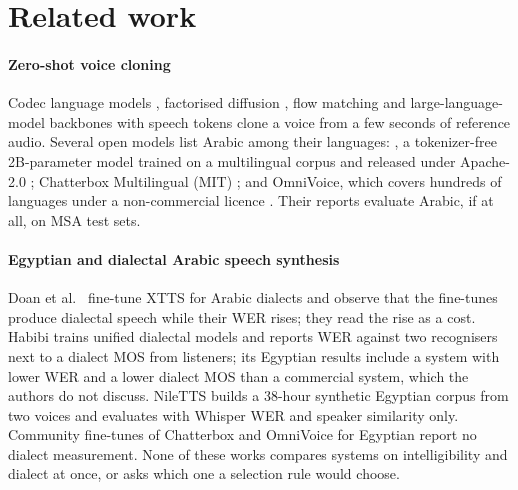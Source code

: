 \section{Related work}\label{sec:related}

\paragraph{Zero-shot voice cloning}
Codec language models \citep{chen2025valle}, factorised diffusion \citep{ju2024naturalspeech3}, flow matching
\citep{chen2025f5tts} and large-language-model backbones with speech tokens \citep{du2024cosyvoice,du2024cosyvoice2,
du2025cosyvoice3,hu2026qwen3tts,liao2024fishspeech,casanova2024xtts} clone a voice from a few seconds of reference
audio. Several open models list Arabic among their languages: \vox, a tokenizer-free 2B-parameter model trained on a
multilingual corpus and released under Apache-2.0 \citep{zhou2025voxcpm,zhou2026voxcpm2,openbmb2026voxcpm2card};
Chatterbox Multilingual (MIT) \citep{resemble2025chatterbox}; and OmniVoice, which covers hundreds of languages under
a non-commercial licence \citep{zhu2026omnivoice}. Their reports evaluate Arabic, if at all, on MSA test sets.

\paragraph{Egyptian and dialectal Arabic speech synthesis}
Doan et al.\ \citep{doan2024arabicdialects} fine-tune XTTS for Arabic dialects and observe that the fine-tunes
produce dialectal speech while their WER rises; they read the rise as a cost. Habibi \citep{chen2026habibi} trains
unified dialectal models and reports WER against two recognisers next to a dialect MOS from listeners; its Egyptian
results include a system with lower WER and a lower dialect MOS than a commercial system, which the authors do not
discuss. NileTTS \citep{khamis2026niletts} builds a 38-hour synthetic Egyptian corpus from two voices and evaluates
with Whisper WER and speaker similarity only. Community fine-tunes of Chatterbox and OmniVoice for Egyptian
\citep{namaa2026egyptiantts,oddadmix2026lahgtna,aly2026voicetut} report no dialect measurement. None of these works
compares systems on intelligibility and dialect at once, or asks which one a selection rule would choose.

